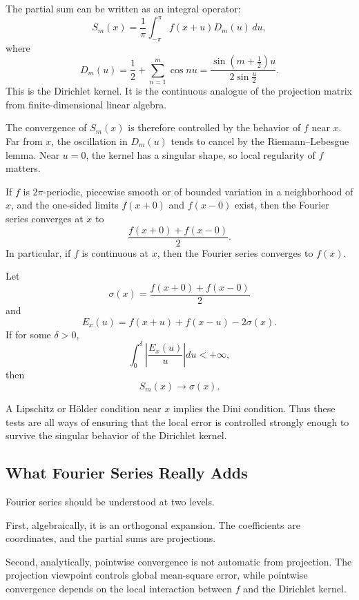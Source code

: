 The partial sum can be written as an integral operator:
\[
    S_m(x)=\frac1\pi\int_{-\pi}^{\pi}f(x+u)D_m(u)\,du,
\]
where
\[
    D_m(u)=\frac12+\sum_{n=1}^{m}\cos nu
    =\frac{\sin\left(m+\frac12\right)u}{2\sin\frac u2}.
\]
This is the Dirichlet kernel. It is the continuous analogue of the projection matrix from finite-dimensional linear algebra.

The convergence of $S_m(x)$ is therefore controlled by the behavior of $f$ near $x$. Far from $x$, the oscillation in $D_m(u)$ tends to cancel by the Riemann--Lebesgue lemma. Near $u=0$, the kernel has a singular shape, so local regularity of $f$ matters.

\begin{theorem}
If $f$ is $2\pi$-periodic, piecewise smooth or of bounded variation in a neighborhood of $x$, and the one-sided limits $f(x+0)$ and $f(x-0)$ exist, then the Fourier series converges at $x$ to
\[
    \frac{f(x+0)+f(x-0)}2.
\]
In particular, if $f$ is continuous at $x$, then the Fourier series converges to $f(x)$.
\end{theorem}

\begin{theorem}
Let
\[
    \sigma(x)=\frac{f(x+0)+f(x-0)}2
\]
and
\[
    E_x(u)=f(x+u)+f(x-u)-2\sigma(x).
\]
If for some $\delta>0$,
\[
    \int_0^{\delta}\left|\frac{E_x(u)}{u}\right|du<+\infty,
\]
then
\[
    S_m(x)\to \sigma(x).
\]
\end{theorem}

A Lipschitz or Hölder condition near $x$ implies the Dini condition. Thus these tests are all ways of ensuring that the local error is controlled strongly enough to survive the singular behavior of the Dirichlet kernel.

\subsection{What Fourier Series Really Adds}

Fourier series should be understood at two levels.

First, algebraically, it is an orthogonal expansion. The coefficients are coordinates, and the partial sums are projections.

Second, analytically, pointwise convergence is not automatic from projection. The projection viewpoint controls global mean-square error, while pointwise convergence depends on the local interaction between $f$ and the Dirichlet kernel.

